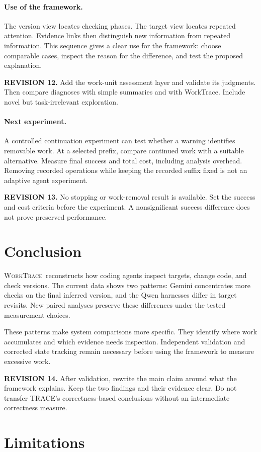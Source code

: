 \documentclass[10pt,a4paper,twocolumn]{article}
\newcommand{\rev}[2]{\par\smallskip\noindent\begin{minipage}{\linewidth}\color{revision}\footnotesize\textbf{REVISION #1.} #2\end{minipage}\par\smallskip}
\newcommand{\wt}{\textsc{WorkTrace}}
\begin{document}
\paragraph{Use of the framework.}
The version view locates checking phases. The target view locates repeated attention. Evidence links then distinguish new information from repeated information. This sequence gives a clear use for the framework: choose comparable cases, inspect the reason for the difference, and test the proposed explanation.
\rev{12}{Add the work-unit assessment layer and validate its judgments. Then compare diagnoses with simple summaries and with WorkTrace. Include novel but task-irrelevant exploration.}

\paragraph{Next experiment.}
A controlled continuation experiment can test whether a warning identifies removable work. At a selected prefix, compare continued work with a suitable alternative. Measure final success and total cost, including analysis overhead. Removing recorded operations while keeping the recorded suffix fixed is not an adaptive agent experiment.
\rev{13}{No stopping or work-removal result is available. Set the success and cost criteria before the experiment. A nonsignificant success difference does not prove preserved performance.}

\section{Conclusion}
\wt\ reconstructs how coding agents inspect targets, change code, and check versions. The current data shows two patterns: Gemini concentrates more checks on the final inferred version, and the Qwen harnesses differ in target revisits. New paired analyses preserve these differences under the tested measurement choices.

These patterns make system comparisons more specific. They identify where work accumulates and which evidence needs inspection. Independent validation and corrected state tracking remain necessary before using the framework to measure excessive work.
\rev{14}{After validation, rewrite the main claim around what the framework explains. Keep the two findings and their evidence clear. Do not transfer TRACE's correctness-based conclusions without an intermediate correctness measure.}

\section*{Limitations}
\end{document}
